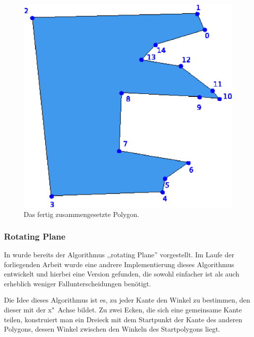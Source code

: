 \begin{figure}
	\centering
	\includegraphics[scale=0.6]{JLL3.svg.eps}
	\caption{Das fertig zusammengesetzte Polygon.}
	\label{fig:JLL3}
\end{figure}



\subsubsection{Rotating Plane} \label{rotPane}
In \cite{TG} wurde bereits der Algorithmus ,,rotating Plane'' vorgestellt. Im Laufe der forliegenden Arbeit wurde eine andrere Implementierung dieses Algorithmus entwickelt und hierbei eine Version gefunden, die sowohl einfacher ist als auch erheblich weniger Fallunterscheidungen benötigt.

Die Idee dieses Algorithmus ist es, zu jeder Kante den Winkel zu bestimmen, den dieser mit der x"~Achse bildet. Zu zwei Ecken, die sich eine gemeinsame Kante teilen, konstruiert man ein Dreieck mit dem Startpunkt der Kante des anderen Polygons, dessen Winkel zwischen den Winkeln des Startpolygons liegt.

